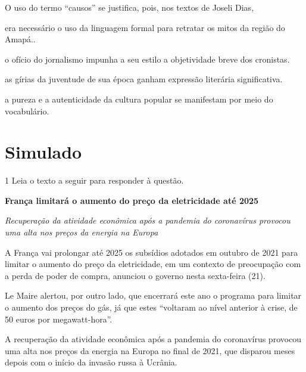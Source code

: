 O uso do termo ``causos'' se justifica, pois, nos textos de Joseli Dias,

\begin{escolha}
    
    \item era necessário o uso da linguagem formal para retratar os mitos da região do Amapá..
    
    \item o ofício do jornalismo impunha a seu estilo a objetividade breve dos cronistas.
    
    \item as gírias da juventude de sua época ganham expressão literária significativa.
    
    \item a pureza e a autenticidade da cultura popular se manifestam por meio do vocabulário.

\end{escolha}


\chapter[Simulado 4]{Simulado}

\num{1} Leia o texto a seguir para responder à questão. 

\begin{myquote}

\textbf{França limitará o aumento do preço da eletricidade até 2025}

\textit{Recuperação da atividade econômica após a pandemia do coronavírus
provocou uma alta nos preços da energia na Europa}

A França vai prolongar até 2025 os subsídios adotados em outubro de 2021
para limitar o aumento do preço da eletricidade, em um contexto de
preocupação com a perda de poder de compra, anunciou o governo nesta
sexta-feira (21).

Le Maire alertou, por outro lado, que encerrará este ano o programa para
limitar o aumento dos preços do gás, já que estes ``voltaram ao nível
anterior à crise, de 50 euros por megawatt-hora''.

A recuperação da atividade econômica após a pandemia do coronavírus
provocou uma alta nos preços da energia na Europa no final de 2021, que
disparou meses depois com o início da invasão russa à Ucrânia.

\end{myquote}

